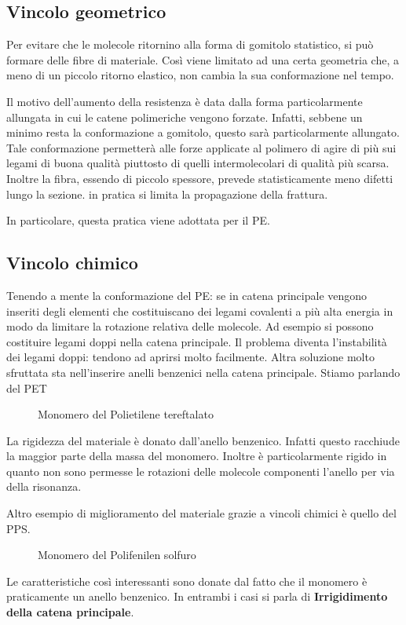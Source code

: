 \subsection{Vincolo geometrico}
Per evitare che le molecole ritornino alla forma di gomitolo statistico, si può formare delle fibre di materiale. Così viene limitato ad una certa geometria che, a meno di un piccolo ritorno elastico, non cambia la sua conformazione nel tempo.

Il motivo dell'aumento della resistenza è data dalla forma particolarmente allungata in cui le catene polimeriche vengono forzate.
Infatti, sebbene un minimo resta la conformazione a gomitolo, questo sarà particolarmente allungato. Tale conformazione permetterà alle forze applicate al polimero di agire di più sui legami di buona qualità piuttosto di quelli intermolecolari di qualità più scarsa.
Inoltre la fibra, essendo di piccolo spessore, prevede statisticamente meno difetti lungo la sezione. in pratica si limita la propagazione della frattura.

In particolare, questa pratica viene adottata per il \ac{PE}.

\subsection{Vincolo chimico}
Tenendo a mente la conformazione del \ac{PE}: se in catena principale vengono inseriti degli elementi che costituiscano dei legami covalenti a più alta energia in modo da limitare la rotazione relativa delle molecole.
Ad esempio si possono costituire legami doppi nella catena principale.
Il problema diventa l'instabilità dei legami doppi: tendono ad aprirsi molto facilmente.
Altra soluzione molto sfruttata sta nell'inserire anelli benzenici nella catena principale.
Stiamo parlando del \ac{PET}

\begin{figure}
\centering
{}
\caption{Monomero del Polietilene tereftalato}
\label{fig:PET}
\end{figure}

La rigidezza del materiale è donato dall'anello benzenico. Infatti questo racchiude la maggior parte della massa del monomero. Inoltre è particolarmente rigido in quanto non sono permesse le rotazioni delle molecole componenti l'anello per via della risonanza.

Altro esempio di miglioramento del materiale grazie a vincoli chimici è quello del \ac{PPS}.
\begin{figure}
\centering
{}
\caption{Monomero del Polifenilen solfuro}
\label{fig:PPS}
\end{figure}
Le caratteristiche così interessanti sono donate dal fatto che il monomero è praticamente un anello benzenico.
In entrambi i casi si parla di \textbf{Irrigidimento della catena principale}.

